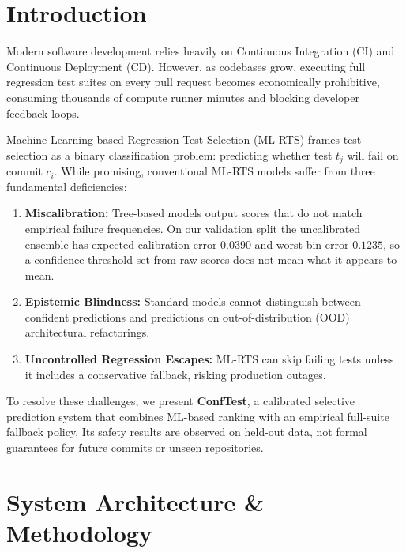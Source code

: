 \documentclass[sigconf,screen]{acmart}
\begin{document}

\maketitle

\section{Introduction}
Modern software development relies heavily on Continuous Integration (CI) and Continuous Deployment (CD). However, as codebases grow, executing full regression test suites on every pull request becomes economically prohibitive, consuming thousands of compute runner minutes and blocking developer feedback loops.

Machine Learning-based Regression Test Selection (ML-RTS) frames test selection as a binary classification problem: predicting whether test $t_j$ will fail on commit $c_i$. While promising, conventional ML-RTS models suffer from three fundamental deficiencies:
\begin{enumerate}
    \item \textbf{Miscalibration:} Tree-based models output scores that do not match empirical failure frequencies. On our validation split the uncalibrated ensemble has expected calibration error $0.0390$ and worst-bin error $0.1235$, so a confidence threshold set from raw scores does not mean what it appears to mean.
    \item \textbf{Epistemic Blindness:} Standard models cannot distinguish between confident predictions and predictions on out-of-distribution (OOD) architectural refactorings.
    \item \textbf{Uncontrolled Regression Escapes:} ML-RTS can skip failing tests unless it includes a conservative fallback, risking production outages.
\end{enumerate}

To resolve these challenges, we present \textbf{ConfTest}, a calibrated selective prediction system that combines ML-based ranking with an empirical full-suite fallback policy. Its safety results are observed on held-out data, not formal guarantees for future commits or unseen repositories.

\section{System Architecture \& Methodology}
\end{document}
